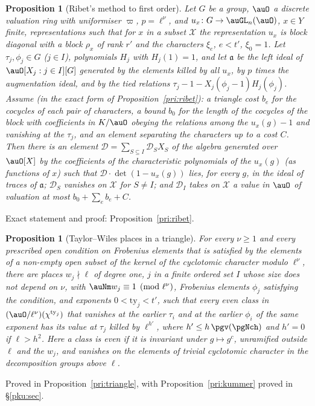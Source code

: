 \documentclass[10pt]{amsart}
\newtheorem{proposition}[theorem]{Proposition}
\theoremstyle{definition}
\theoremstyle{remark}
\begin{document}
\begin{proposition}[Ribet's method to first order]\label{pg:ribet}
Let $G$ be a group, $\auO$ a discrete valuation ring with uniformiser $\varpi$, $p=\ell^\nu$, and
$u_x\colon G\to\auGL_n(\auO)$, $x\in Y$ finite, representations such that for $x$ in a subset
$\mathcal X$ the representation $u_x$ is block diagonal with a block $\rho_x$ of rank $r'$ and
the characters $\xi_e$, $e<t'$, $\xi_0=1$. Let $\tau_j,\phi_j\in G$ ($j\in I$), polynomials
$H_j$ with $H_j(1)=1$, and let $\mathfrak a$ be the left ideal of $\auO[X_j:j\in I][G]$ generated
by the elements killed by all $u_x$, by $p$ times the augmentation ideal, and by the \emph{tied
relations} $\tau_j-1-X_j(\phi_j-1)H_j(\phi_j)$. Assume (in the exact form of
Proposition~\ref{pri:ribet}): a triangle
cost $b_e$ for the cocycles of each pair of characters, a bound $b_0$ for the length of the
cocycles of the block with coefficients in $K/\auO$ obeying the relations among the $u_x(g)-1$ and
vanishing at the $\tau_j$, and an element separating the characters up to a cost $C$. Then there
is an element $\mathcal D=\sum_{S\subseteq I}\mathcal D_SX_S$ of the algebra generated over
$\auO[X]$ by the coefficients of the characteristic polynomials of the $u_x(g)$ (as functions of
$x$) such that $\mathcal D\cdot\det(1-u_x(g))$ lies, for every $g$, in the ideal of traces of
$\mathfrak a$; $\mathcal D_S$ vanishes on $\mathcal X$ for $S\ne I$; and $\mathcal D_I$ takes on
$\mathcal X$ a value in $\auO$ of valuation at most $b_0+\sum_eb_e+C$.
\end{proposition}
\smallskip\noindent Exact statement and proof: Proposition~\ref{pri:ribet}.\par\smallskip

\begin{proposition}[Taylor--Wiles places in a triangle]\label{pg:triangle}
For every $\nu\ge1$ and every prescribed open condition on Frobenius elements that is satisfied by
the elements of a non-empty open subset of the kernel of the cyclotomic character modulo
$\ell^\nu$, there are places $w_j\nmid\ell$ of degree one, $j$ in a finite ordered set $I$ whose
size does not depend on $\nu$, with $\auNm w_j\equiv1\pmod{\ell^\nu}$, Frobenius elements $\phi_j$
satisfying the condition, and exponents $0<\mathrm{ty}_j<t'$, such that every even class in
$(\auO/\ell^\nu)(\chi^{\mathrm{ty}_j})$ that vanishes at the earlier $\tau_i$ and at the earlier
$\phi_i$ of the same exponent has its value at $\tau_j$ killed by $\ell^{h'}$, where $h'\le
h\,\pgv(\pgNch)$ and $h'=0$ if $\ell>h^2$. Here a class is \emph{even} if it is invariant under
$g\mapsto g^c$, unramified outside $\ell$ and the $w_j$, and vanishes on the elements of trivial cyclotomic character in the decomposition groups above $\ell$.
\end{proposition}
\smallskip\noindent Proved in Proposition~\ref{pri:triangle}, with Proposition~\ref{pri:kummer} proved in
\S\ref{pku:sec}.\par\smallskip
\end{document}
